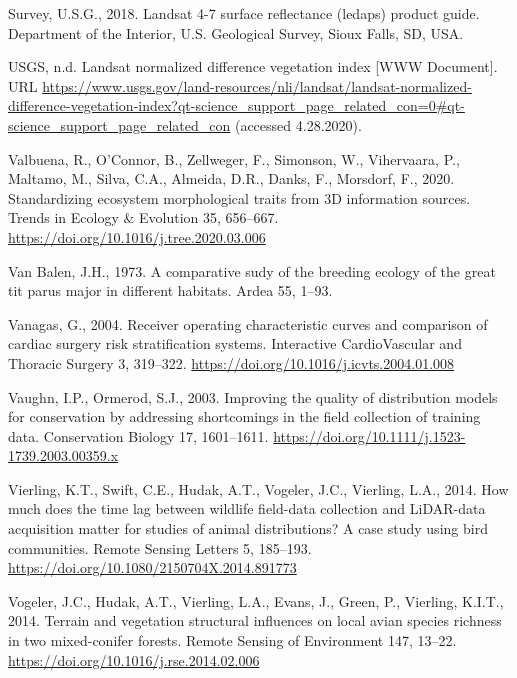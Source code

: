 \documentclass[
  12pt,
]{article}
\newlength{\cslhangindent}
\newlength{\cslentryspacingunit} %
\newenvironment{CSLReferences}[2] %
 {%
  \setlength{\parindent}{0pt}
  \ifodd #1
  \let\oldpar\par
  \def\par{\hangindent=\cslhangindent\oldpar}
  \fi
  \setlength{\parskip}{#2\cslentryspacingunit}
 }%
 {}
\begin{document}
\begin{CSLReferences}{1}{0}
\leavevmode{}%
Survey, U.S.G., 2018. Landsat 4-7 surface reflectance (ledaps) product guide. Department of the Interior, U.S. Geological Survey, Sioux Falls, {SD}, {USA}.

\leavevmode{}%
USGS, n.d. Landsat normalized difference vegetation index {[}WWW Document{]}. URL \url{https://www.usgs.gov/land-resources/nli/landsat/landsat-normalized-difference-vegetation-index?qt-science_support_page_related_con=0\#qt-science_support_page_related_con} (accessed 4.28.2020).

\leavevmode{}%
Valbuena, R., O'Connor, B., Zellweger, F., Simonson, W., Vihervaara, P., Maltamo, M., Silva, C.A., Almeida, D.R., Danks, F., Morsdorf, F., 2020. Standardizing ecosystem morphological traits from 3D information sources. Trends in Ecology \& Evolution 35, 656--667. \url{https://doi.org/10.1016/j.tree.2020.03.006}

\leavevmode{}%
Van Balen, J.H., 1973. A comparative sudy of the breeding ecology of the great tit parus major in different habitats. Ardea 55, 1--93.

\leavevmode{}%
Vanagas, G., 2004. Receiver operating characteristic curves and comparison of cardiac surgery risk stratification systems. Interactive {CardioVascular} and Thoracic Surgery 3, 319--322. \url{https://doi.org/10.1016/j.icvts.2004.01.008}

\leavevmode{}%
Vaughn, I.P., Ormerod, S.J., 2003. Improving the quality of distribution models for conservation by addressing shortcomings in the field collection of training data. Conservation Biology 17, 1601--1611. \url{https://doi.org/10.1111/j.1523-1739.2003.00359.x}

\leavevmode{}%
Vierling, K.T., Swift, C.E., Hudak, A.T., Vogeler, J.C., Vierling, L.A., 2014. How much does the time lag between wildlife field-data collection and {LiDAR}-data acquisition matter for studies of animal distributions? A case study using bird communities. Remote Sensing Letters 5, 185--193. \url{https://doi.org/10.1080/2150704X.2014.891773}

\leavevmode{}%
Vogeler, J.C., Hudak, A.T., Vierling, L.A., Evans, J., Green, P., Vierling, K.I.T., 2014. Terrain and vegetation structural influences on local avian species richness in two mixed-conifer forests. Remote Sensing of Environment 147, 13--22. \url{https://doi.org/10.1016/j.rse.2014.02.006}


\end{CSLReferences}
\end{document}
